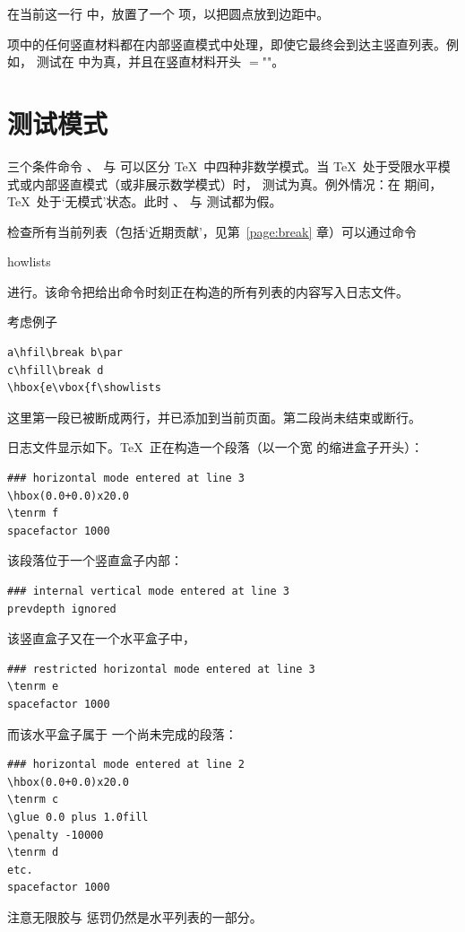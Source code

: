 \documentclass[a4paper]{rapport3}
\makeatletter
\def\cstoidx#1\par{\index{#1@\cs{#1}}}
\def\csidx#1{\cstoidx #1\par\cs{#1}}
\makeatother
\begin{document}
在当前这一行
中，放置了一个  项，以把圆点放到边距中。

 项中的任何竖直材料都在内部竖直模式中处理，即使它最终会到达主竖直列表。例如， 测试在  中为真，并且在竖直材料开头
\mdqon
{}$=$""\n{-1000pt}。
\mdqoff

\section{测试模式}

三个条件命令 、 与  可以区分 \TeX\ 中四种非数学模式。当 \TeX\ 处于受限水平模式或内部竖直模式（或非展示数学模式）时， 测试为真。例外情况：在  期间，\TeX\ 处于`无模式'状态。此时 、 与  测试都为假。

检查所有当前列表（包括`近期贡献'，见第~\ref{page:break} 章）可以通过命令 \csidx{showlists}\label{showlists} 进行。该命令把给出命令时刻正在构造的所有列表的内容写入日志文件。

考虑例子
\begin{verbatim}
a\hfil\break b\par
c\hfill\break d
\hbox{e\vbox{f\showlists
\end{verbatim}
这里第一段已被断成两行，并已添加到当前页面。第二段尚未结束或断行。

日志文件显示如下。\TeX\ 正在构造一个段落（以一个宽 \n{20pt} 的缩进盒子开头）：\begin{verbatim}
### horizontal mode entered at line 3
\hbox(0.0+0.0)x20.0
\tenrm f
spacefactor 1000
\end{verbatim}
该段落位于一个竖直盒子内部：\begin{verbatim}
### internal vertical mode entered at line 3
prevdepth ignored
\end{verbatim}
该竖直盒子又在一个水平盒子中，
\begin{verbatim}
### restricted horizontal mode entered at line 3
\tenrm e
spacefactor 1000
\end{verbatim}
\awp
而该水平盒子属于
一个尚未完成的段落：\begin{verbatim}
### horizontal mode entered at line 2
\hbox(0.0+0.0)x20.0
\tenrm c
\glue 0.0 plus 1.0fill
\penalty -10000
\tenrm d
etc.
spacefactor 1000
\end{verbatim}
注意无限胶与  惩罚仍然是水平列表的一部分。
\end{document}

